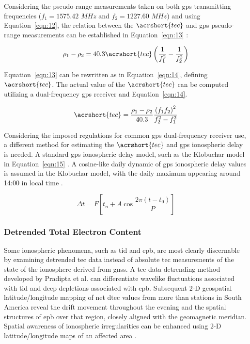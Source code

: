 \documentclass[sn-mathphys-num]{sn-jnl}%
\begin{document}
Considering the pseudo-range measurements taken on both \acrshort{gps} transmitting frequencies ($f_{1}=1575.42$ $MHz$ and $f_{2}=1227.60$ $MHz$) and using Equation~\ref{eqn:12}, the relation between the $\acrshort{tec}$ and \acrshort{gps} pseudo-range measurements can be established in Equation~\ref{eqn:13} \cite{spilker1996global}:
 
\begin{equation}
	\rho_{1} - \rho_{2} = 40.3 \acrshort{tec} \left( \frac{1}{f_{1}^{2}} - \frac{1}{f_{2}^{2}} \right)
	\label{eqn:13}
\end{equation}

Equation~\ref{eqn:13} can be rewritten as in Equation~\ref{eqn:14}, defining $\acrshort{tec}$. The actual value of the $\acrshort{tec}$ can be computed utilizing a dual-frequency \acrshort{gps} receiver and Equation~\ref{eqn:14}.

\begin{equation}
	\acrshort{tec} = \frac{\rho_{1} - \rho_{2}}{40.3} \frac{{\left(f_{1}f_{2}\right)}^{2}}{f_{2}^{2}-f_{1}^{2}}
	\label{eqn:14}
\end{equation}

Considering the imposed regulations for common \acrshort{gps} dual-frequency receiver use, a different method for estimating the $\acrshort{tec}$ and \acrshort{gps} ionospheric delay is needed. A standard \acrshort{gps} ionospheric delay model, such as the Klobuchar model in Equation~\ref{eqn:15} \cite{enge1994global,spilker1996global}. A cosine-like daily dynamic of \acrshort{gps} ionospheric delay values is assumed in the Klobuchar model, with the daily maximum appearing around 14:00 in local time \cite{klobuchar1987ionospheric}.

\begin{equation}
	\Delta t = F \left[ t_{n} + A \cos \frac{2\pi\left(t-t_{0}\right)}{P} \right]
	\label{eqn:15}
\end{equation}

\subsubsection{Detrended Total Electron Content}

Some ionospheric phenomena, such as \acrfull{tid} and \acrfull{epb}, are most clearly discernable by examining detrended \acrshort{tec} data instead of absolute \acrshort{tec} measurements of the state of the ionosphere derived from \acrshort{gnss}. A \acrshort{tec} data detrending method developed by Pradipta et al. \cite{Pradipta2015} can differentiate wavelike fluctuations associated with \acrshort{tid} and deep depletions associated with \acrshort{epb}. Subsequent 2-D geospatial latitude/longitude mapping of net \acrfull{dtec} values from more than stations in South America reveal the drift movement throughout the evening and the spatial structures of \acrshort{epb} over that region, closely aligned with the geomagnetic meridian. Spatial awareness of ionospheric irregularities can be enhanced using 2-D latitude/longitude maps of an affected area \cite{Pradipta2019}.
\end{document}
